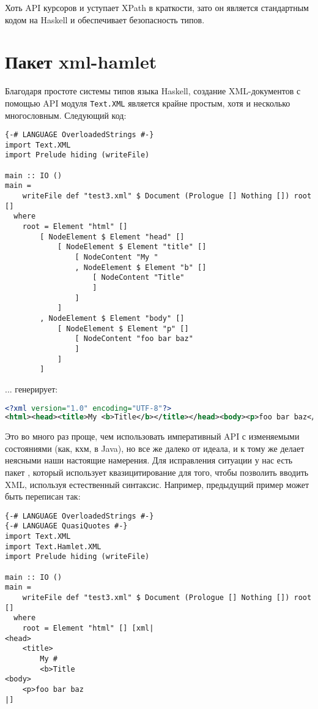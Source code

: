 Хоть API курсоров и уступает XPath в краткости, зато он является стандартным кодом на Haskell и обеспечивает безопасность типов.

\section{Пакет xml-hamlet}

Благодаря простоте системы типов языка Haskell, создание XML-документов с помощью API модуля \lstinline!Text.XML! является крайне простым, хотя и несколько многословным. Следующий код:

\begin{lstlisting}
{-# LANGUAGE OverloadedStrings #-}
import Text.XML
import Prelude hiding (writeFile)

main :: IO ()
main =
    writeFile def "test3.xml" $ Document (Prologue [] Nothing []) root []
  where
    root = Element "html" []
        [ NodeElement $ Element "head" []
            [ NodeElement $ Element "title" []
                [ NodeContent "My "
                , NodeElement $ Element "b" []
                    [ NodeContent "Title"
                    ]
                ]
            ]
        , NodeElement $ Element "body" []
            [ NodeElement $ Element "p" []
                [ NodeContent "foo bar baz"
                ]
            ]
        ]
\end{lstlisting}

... генерирует:

\begin{lstlisting}[language=XML]
<?xml version="1.0" encoding="UTF-8"?>
<html><head><title>My <b>Title</b></title></head><body><p>foo bar baz</p></body></html>
\end{lstlisting}

Это во много раз проще, чем использовать императивный API с изменяемыми состояниями (как, кхм, в Java), но все же далеко от идеала, и к тому же делает неясными наши настоящие намерения. Для исправления ситуации у нас есть пакет , который использует квазицитирование для того, чтобы позволить вводить XML, используя естественный синтаксис. Например, предыдущий пример может быть переписан так:

\begin{lstlisting}
{-# LANGUAGE OverloadedStrings #-}
{-# LANGUAGE QuasiQuotes #-}
import Text.XML
import Text.Hamlet.XML
import Prelude hiding (writeFile)

main :: IO ()
main =
    writeFile def "test3.xml" $ Document (Prologue [] Nothing []) root []
  where
    root = Element "html" [] [xml|
<head>
    <title>
        My #
        <b>Title
<body>
    <p>foo bar baz
|]
\end{lstlisting}%

